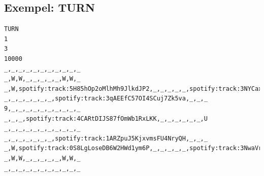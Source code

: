 \documentclass[a4paper, 10pt]{article}
\begin{document}
\subsection*{Exempel: TURN}
\begin{verbatim}
TURN
1
3
10000
_,_,_,_,_,_,_,_,_,_,_
_,W,W,_,_,_,_,_,W,W,_
_,W,spotify:track:5H85hOp2oMlhMh9JlkdJP2,_,_,_,_,_,spotify:track:3NYCaxkggl0Hh8vQptSUvV,W,_
_,_,_,_,_,_,_,spotify:track:3qAEEfC57OI4SCuj7Zk5va,_,_,_
9,_,_,_,_,_,_,_,_,_,_
_,_,_,spotify:track:4CARtDIJS87fOmWb1RxLKK,_,_,_,_,_,_,U
_,_,_,_,_,_,_,_,_,_,_
_,_,_,_,_,_,_,spotify:track:1ARZpuJ5KjxvmsFU4NryQH,_,_,_
_,W,spotify:track:0S8LgLoseDB6W2HWd1ym6P,_,_,_,_,_,spotify:track:3NwaVr6RJg2LPBcJ1Ysl1O,W,_
_,W,W,_,_,_,_,_,W,W,_
_,_,_,_,_,_,_,_,_,_,_
\end{verbatim}
\normalsize
\end{document}
